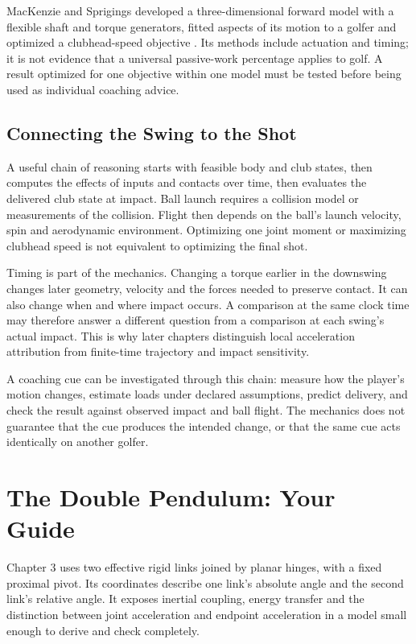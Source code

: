 MacKenzie and Sprigings developed a three-dimensional forward model with a flexible shaft and torque generators, fitted aspects of its motion to a golfer and optimized a clubhead-speed objective \citep{mackenzie2009}. Its methods include actuation and timing; it is not evidence that a universal passive-work percentage applies to golf. A result optimized for one objective within one model must be tested before being used as individual coaching advice.

\subsection{Connecting the Swing to the Shot}\label{ch01:connecting-the-swing-to-the-shot}

A useful chain of reasoning starts with feasible body and club states, then computes the effects of inputs and contacts over time, then evaluates the delivered club state at impact. Ball launch requires a collision model or measurements of the collision. Flight then depends on the ball's launch velocity, spin and aerodynamic environment. Optimizing one joint moment or maximizing clubhead speed is not equivalent to optimizing the final shot.

Timing is part of the mechanics. Changing a torque earlier in the downswing changes later geometry, velocity and the forces needed to preserve contact. It can also change when and where impact occurs. A comparison at the same clock time may therefore answer a different question from a comparison at each swing's actual impact. This is why later chapters distinguish local acceleration attribution from finite-time trajectory and impact sensitivity.

A coaching cue can be investigated through this chain: measure how the player's motion changes, estimate loads under declared assumptions, predict delivery, and check the result against observed impact and ball flight. The mechanics does not guarantee that the cue produces the intended change, or that the same cue acts identically on another golfer.

\protect{}\label{ch01:the-double-pendulum}{}

\section{The Double Pendulum: Your Guide}\label{ch01:the-double-pendulum-your-guide}

Chapter 3 uses two effective rigid links joined by planar hinges, with a fixed proximal pivot. Its coordinates describe one link's absolute angle and the second link's relative angle. It exposes inertial coupling, energy transfer and the distinction between joint acceleration and endpoint acceleration in a model small enough to derive and check completely.

